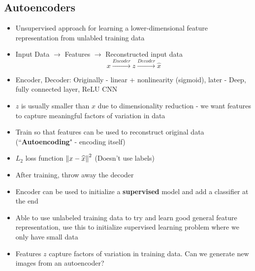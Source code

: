 \subsection{Autoencoders}
\begin{itemize}
	\item Unsupervised approach for learning a lower-dimensional feature representation from unlabled training data
	\item Input Data $\rightarrow$ Features $\rightarrow$ Reconstructed input data
	$$x\overset{Encoder}{\longrightarrow} z \overset{Decoder}{\longrightarrow} \widehat{x}$$
	\item Encoder, Decoder: Originally - linear + nonlinearity (sigmoid), later - Deep, fully connected layer, ReLU CNN
	\item $z$ is usually smaller than $x$ due to dimensionality reduction - we want features to capture meaningful factors of variation in data
	\item Train so that features can be used to reconstruct original data (``\textbf{Autoencoding}" - encoding itself)
	\item $L_2$ loss function $\left\lVert x-\widehat{x}\right\rVert^2$ (Doesn't use labels)
	\item After training, throw away the decoder
	\item Encoder can be used to initialize a \textbf{supervised} model and add a classifier at the end
	\item Able to use unlabeled training data to try and learn good general feature representation, use this to initialize supervised learning problem where we only have small data
	\item Features $z$ capture factors of variation in training data. Can we generate new images from an autoencoder?
\end{itemize}

